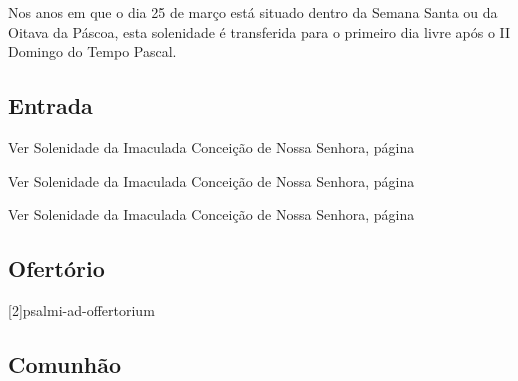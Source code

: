 
\begin{rubrica}
  Nos anos em que o dia 25 de março está situado dentro da Semana Santa ou da Oitava da Páscoa, esta solenidade é transferida para o primeiro dia livre após o II Domingo do Tempo Pascal.
\end{rubrica}

\subsection{Entrada}\label{subsection:proprium-sanctorum/in-annuntiatione-domini/introitus}

\begin{rubrica}
  Ver Solenidade da Imaculada Conceição de Nossa Senhora, página~\pageref{subsection:proprium-sanctorum/in-conceptione-immaculata-bmv/psalmus-responsorius}
\end{rubrica}

\begin{rubrica}
  Ver Solenidade da Imaculada Conceição de Nossa Senhora, página~\pageref{subsection:proprium-sanctorum/in-conceptione-immaculata-bmv/alleluia}
\end{rubrica}

\begin{rubrica}
  Ver Solenidade da Imaculada Conceição de Nossa Senhora, página~\pageref{subsection:proprium-sanctorum/in-conceptione-immaculata-bmv/psalmus-alleluiaticus}
\end{rubrica}

\AllowPageFlush

\subsection{Ofertório}\label{subsection:proprium-sanctorum/in-annuntiatione-domini/offertorium}
[2]{psalmi-ad-offertorium}

\AllowPageBreak

\subsection{Comunhão}\label{subsection:proprium-sanctorum/in-annuntiatione-domini/communio}

\AllowPageFlush